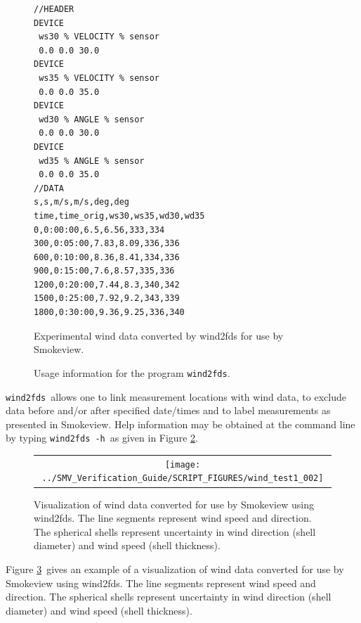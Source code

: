 \documentclass[11pt,twoside]{book}
\begin{document}
\begin{figure}[bph]
{\small
\begin{verbatim}
//HEADER
DEVICE
 ws30 % VELOCITY % sensor
 0.0 0.0 30.0
DEVICE
 ws35 % VELOCITY % sensor
 0.0 0.0 35.0
DEVICE
 wd30 % ANGLE % sensor
 0.0 0.0 30.0
DEVICE
 wd35 % ANGLE % sensor
 0.0 0.0 35.0
//DATA
s,s,m/s,m/s,deg,deg
time,time_orig,ws30,ws35,wd30,wd35
0,0:00:00,6.5,6.56,333,334
300,0:05:00,7.83,8.09,336,336
600,0:10:00,8.36,8.41,334,336
900,0:15:00,7.6,8.57,335,336
1200,0:20:00,7.44,8.3,340,342
1500,0:25:00,7.92,9.2,343,339
1800,0:30:00,9.36,9.25,336,340
\end{verbatim}
}
\caption {Experimental wind data converted by wind2fds for use by Smokeview.}
\label{fig:convertedwinddata}%
\end{figure}

\begin{figure}[bph]
{\small

}
\caption {Usage information for the program {\tt wind2fds}.}
\label{figwind2fdsusage}%
\end{figure}

{\tt wind2fds}\ allows one to link measurement locations with wind data, to exclude data before and/or after specified date/times and to label measurements as presented in Smokeview.
Help information may be obtained at the command line
by typing {\tt wind2fds -h}\ as given in Figure \ref{figwind2fdsusage}.

\begin{figure}[bph]
\begin{center}
\begin{tabular}{c}
 \texttt{[image: ../SMV\_Verification\_Guide/SCRIPT\_FIGURES/wind\_test1\_002]}
 \end{tabular}
\end{center}
 \caption{Visualization of wind data converted for use by Smokeview using wind2fds. The line segments represent
 wind speed and direction.  The spherical shells represent uncertainty
 in wind direction (shell diameter) and wind speed (shell thickness).}
\label{figwind}%
\end{figure}

Figure \ref{figwind}\ gives an example of a visualization of wind data converted for use by Smokeview using wind2fds. The line segments represent
 wind speed and direction.  The spherical shells represent uncertainty
 in wind direction (shell diameter) and wind speed (shell thickness).


\end{document}
